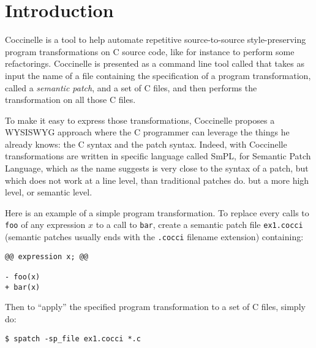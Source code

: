 \chapter{Introduction}

Coccinelle is a tool to help automate repetitive 
source-to-source style-preserving program transformations
on C source code, like for instance to perform some refactorings.
Coccinelle is presented as a command line tool called \spatch that takes
as input the name of a file containing the specification of a program
transformation, called a {\em semantic patch}, and a set of C files,
and then performs the transformation on all those C files.

To make it easy to express those transformations,
Coccinelle proposes a WYSISWYG approach where the C programmer 
can leverage the things he already knows: the C syntax
and the patch syntax. Indeed, with Coccinelle transformations
are written in specific language called SmPL, for 
Semantic Patch Language, which as the name suggests is very
close to the syntax of a patch, but which does not 
work at a line level, than traditional patches do.
but a more high level, or semantic level.

Here is an example of a simple program transformation.
To replace every calls to \verb+foo+ of any expression $x$ 
to a call to \verb+bar+, create a semantic patch file \verb+ex1.cocci+
(semantic patches usually ends with the \verb+.cocci+  filename extension)
containing:
\begin{verbatim}
@@ expression x; @@

- foo(x)
+ bar(x)

\end{verbatim}

Then to ``apply'' the specified program transformation to a set of C files,
simply do:
\begin{verbatim}
$ spatch -sp_file ex1.cocci *.c
\end{verbatim}





